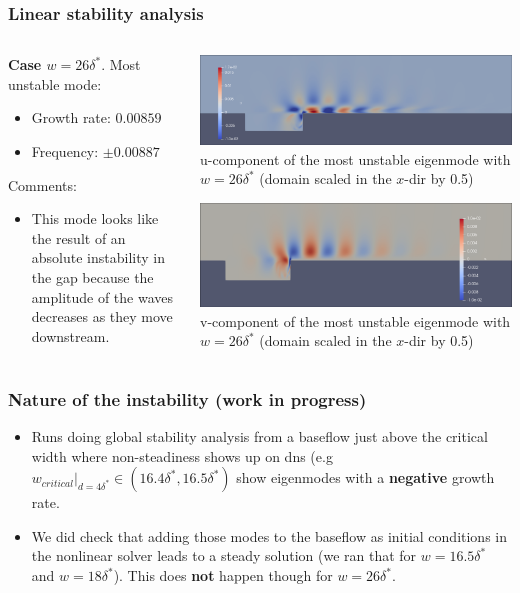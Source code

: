 \documentclass[
  aspectratio=169, %
  t, %
  onlytextwidth, %
  10pt, %
]{beamer}
\begin{document}
\begin{frame}
  \frametitle{Linear stability analysis}
  \begin{columns}[T] %
    \begin{column}{0.48\linewidth} %
    \textbf{Case $w = 26\delta^*$}. Most unstable mode:
      \begin{itemize}
	\item Growth rate: $0.00859$
	\item Frequency: $\pm0.00887$
      \end{itemize}
      Comments:
      \begin{itemize}
	\item This mode looks like the result of an absolute instability in the gap because the amplitude of the waves decreases as they move downstream.
      \end{itemize}
     \end{column}
    \begin{column}{0.48\linewidth} %
      {
	\centering
	\includegraphics[width=0.85\linewidth]{Images/uem26.png}
	u-component of the most unstable eigenmode with $w = 26\delta^*$ (domain scaled in the $x$-dir by 0.5)

      }
      {
	\centering
	\includegraphics[width=0.85\linewidth]{Images/vem26.png}
	v-component of the most unstable eigenmode with $w = 26\delta^*$ (domain scaled in the $x$-dir by 0.5)

      }
    \end{column}
  \end{columns}
\end{frame}
\begin{frame}
  \frametitle{Nature of the instability (work in progress)}
  \begin{itemize}
  \item Runs doing global stability analysis from a baseflow just above the critical width where non-steadiness shows up on dns (e.g $w_{critical}|_{d= 4\delta^*}\in (16.4\delta^*,16.5\delta^*)$ show eigenmodes with a \textbf{negative} growth rate.
  \item We did check that adding those modes to the baseflow as initial conditions in the nonlinear solver leads to a steady solution (we ran that for $w=16.5\delta^*$ and $w=18\delta^*$). This does \textbf{not} happen though for $w=26\delta^*$.
  \end{itemize}
\end{frame}
\end{document}
